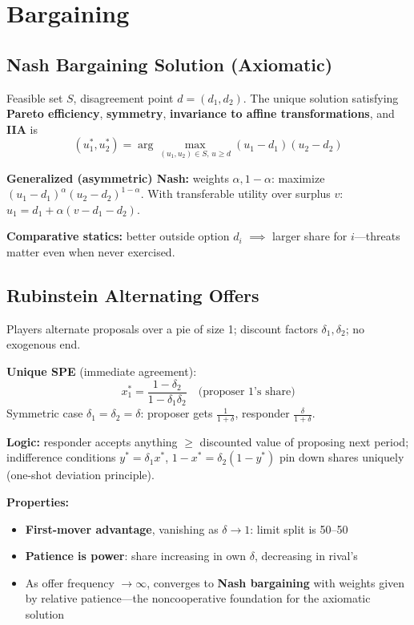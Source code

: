 \section{Bargaining}

\subsection{Nash Bargaining Solution (Axiomatic)}
Feasible set \(S\), disagreement point \(d = (d_1, d_2)\). The unique solution satisfying \textbf{Pareto efficiency}, \textbf{symmetry}, \textbf{invariance to affine transformations}, and \textbf{IIA} is
\[(u_1^*, u_2^*) = \arg\max_{(u_1,u_2) \in S,\, u \geq d} (u_1 - d_1)(u_2 - d_2)\]

\textbf{Generalized (asymmetric) Nash:} weights \(\alpha, 1-\alpha\): maximize \((u_1-d_1)^\alpha (u_2-d_2)^{1-\alpha}\). With transferable utility over surplus \(v\): \(u_1 = d_1 + \alpha(v - d_1 - d_2)\).

\textbf{Comparative statics:} better outside option \(d_i\) \(\implies\) larger share for \(i\)---threats matter even when never exercised.

\subsection{Rubinstein Alternating Offers}
Players alternate proposals over a pie of size 1; discount factors \(\delta_1, \delta_2\); no exogenous end.

\textbf{Unique SPE} (immediate agreement):
\[x_1^* = \frac{1-\delta_2}{1-\delta_1\delta_2} \quad \text{(proposer 1's share)}\]
Symmetric case \(\delta_1 = \delta_2 = \delta\): proposer gets \(\frac{1}{1+\delta}\), responder \(\frac{\delta}{1+\delta}\).

\textbf{Logic:} responder accepts anything \(\geq\) discounted value of proposing next period; indifference conditions \(y^* = \delta_1 x^*\), \(1 - x^* = \delta_2(1 - y^*)\) pin down shares uniquely (one-shot deviation principle).

\textbf{Properties:}
\begin{itemize}[nosep]
    \item \textbf{First-mover advantage}, vanishing as \(\delta \to 1\): limit split is 50--50
    \item \textbf{Patience is power}: share increasing in own \(\delta\), decreasing in rival's
    \item As offer frequency \(\to \infty\), converges to \textbf{Nash bargaining} with weights given by relative patience---the noncooperative foundation for the axiomatic solution
\end{itemize}

